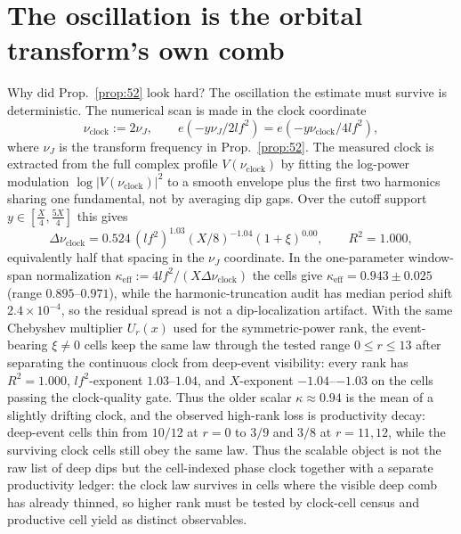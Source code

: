 \documentclass[11pt]{article}
\theoremstyle{definition}
\begin{document}
\section{The oscillation is the orbital transform's own comb}\label{sec:comb}

Why did Prop.~\ref{prop:52} look hard? The oscillation the estimate must survive is deterministic.
The numerical scan is made in the clock coordinate
\[
  \nu_{\mathrm{clock}}:=2\nu_J,\qquad
  e(-y\nu_J/2lf^2)=e(-y\nu_{\mathrm{clock}}/4lf^2),
\]
where $\nu_J$ is the transform frequency in Prop.~\ref{prop:52}. The measured clock is extracted from the
full complex profile $V(\nu_{\mathrm{clock}})$ by fitting the log-power modulation
$\log |V(\nu_{\mathrm{clock}})|^2$ to a smooth envelope plus the first two harmonics sharing one
fundamental, not by averaging dip gaps. Over the cutoff support $y\in[\tfrac X4,\tfrac{5X}4]$ this gives
\[
  \Delta\nu_{\mathrm{clock}}
   =0.524\,(lf^2)^{1.03}(X/8)^{-1.04}(1+\xi)^{0.00},\qquad R^2=1.000,
\]
equivalently half that spacing in the $\nu_J$ coordinate. In the one-parameter window-span normalization
$\kappa_{\mathrm{eff}}:=4lf^2/(X\Delta\nu_{\mathrm{clock}})$ the cells give
$\kappa_{\mathrm{eff}}=0.943\pm0.025$ (range $0.895$--$0.971$), while the harmonic-truncation audit has
median period shift $2.4\times10^{-4}$, so the residual spread is not a dip-localization artifact. With the
same Chebyshev multiplier $U_r(x)$ used for the symmetric-power rank, the event-bearing $\xi\ne0$ cells keep
the same law through the tested range $0\le r\le13$ after separating the continuous clock from deep-event
visibility: every rank has $R^2=1.000$, $lf^2$-exponent $1.03$--$1.04$, and $X$-exponent
$-1.04$--$-1.03$ on the cells passing the clock-quality gate. Thus the older scalar
$\kappa\approx0.94$ is the mean of a slightly drifting clock, and the observed high-rank loss is productivity
decay: deep-event cells thin from $10/12$ at $r=0$ to $3/9$ and $3/8$ at $r=11,12$, while the surviving
clock cells still obey the same law. Thus the scalable object is not the raw list of deep dips but the
cell-indexed phase clock together with a separate productivity ledger: the clock law survives in cells where
the visible deep comb has already thinned, so higher rank must be tested by clock-cell census and productive
cell yield as distinct observables.
\end{document}

